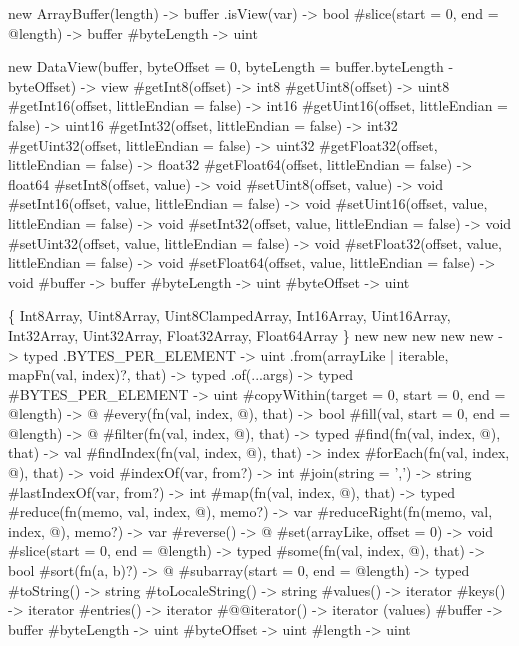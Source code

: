 \begin{DoxyCode}
new ArrayBuffer(length) -> buffer
  .isView(var) -> bool
  #slice(start = 0, end = @length) -> buffer
  #byteLength -> uint

new DataView(buffer, byteOffset = 0, byteLength = buffer.byteLength - byteOffset) -> view
  #getInt8(offset)                          -> int8
  #getUint8(offset)                         -> uint8
  #getInt16(offset, littleEndian = false)   -> int16
  #getUint16(offset, littleEndian = false)  -> uint16
  #getInt32(offset, littleEndian = false)   -> int32
  #getUint32(offset, littleEndian = false)  -> uint32
  #getFloat32(offset, littleEndian = false) -> float32
  #getFloat64(offset, littleEndian = false) -> float64
  #setInt8(offset, value)                          -> void
  #setUint8(offset, value)                         -> void
  #setInt16(offset, value, littleEndian = false)   -> void
  #setUint16(offset, value, littleEndian = false)  -> void
  #setInt32(offset, value, littleEndian = false)   -> void
  #setUint32(offset, value, littleEndian = false)  -> void
  #setFloat32(offset, value, littleEndian = false) -> void
  #setFloat64(offset, value, littleEndian = false) -> void
  #buffer     -> buffer
  #byteLength -> uint
  #byteOffset -> uint

\{
  Int8Array,
  Uint8Array,
  Uint8ClampedArray,
  Int16Array,
  Uint16Array,
  Int32Array,
  Uint32Array,
  Float32Array,
  Float64Array
\}
  new %
  new %
  new %
  new %
  new %
       -> typed
  .BYTES\_PER\_ELEMENT -> uint
  .from(arrayLike | iterable, mapFn(val, index)?, that) -> typed
  .of(...args) -> typed
  #BYTES\_PER\_ELEMENT -> uint
  #copyWithin(target = 0, start = 0, end = @length) -> @
  #every(fn(val, index, @), that) -> bool
  #fill(val, start = 0, end = @length) -> @
  #filter(fn(val, index, @), that) -> typed
  #find(fn(val, index, @), that) -> val
  #findIndex(fn(val, index, @), that) -> index
  #forEach(fn(val, index, @), that) -> void
  #indexOf(var, from?) -> int
  #join(string = ',') -> string
  #lastIndexOf(var, from?) -> int
  #map(fn(val, index, @), that) -> typed
  #reduce(fn(memo, val, index, @), memo?) -> var
  #reduceRight(fn(memo, val, index, @), memo?) -> var
  #reverse() -> @
  #set(arrayLike, offset = 0) -> void
  #slice(start = 0, end = @length) -> typed
  #some(fn(val, index, @), that) -> bool
  #sort(fn(a, b)?) -> @
  #subarray(start = 0, end = @length) -> typed
  #toString() -> string
  #toLocaleString() -> string
  #values()     -> iterator
  #keys()       -> iterator
  #entries()    -> iterator
  #@@iterator() -> iterator (values)
  #buffer     -> buffer
  #byteLength -> uint
  #byteOffset -> uint
  #length     -> uint
\end{DoxyCode}
